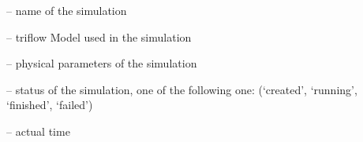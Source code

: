 \documentclass[letterpaper,10pt,english]{sphinxmanual}
\begin{document}
\begin{fulllineitems}

\begin{fulllineitems}
\label{\detokenize{triflow.core:triflow.core.simulation.Simulation.id}}
 -- name of the simulation

\end{fulllineitems}


\begin{fulllineitems}
\label{\detokenize{triflow.core:triflow.core.simulation.Simulation.model}}
 -- triflow Model used in the simulation

\end{fulllineitems}


\begin{fulllineitems}
\label{\detokenize{triflow.core:triflow.core.simulation.Simulation.physical_parameters}}
 -- physical parameters of the simulation

\end{fulllineitems}


\begin{fulllineitems}
\label{\detokenize{triflow.core:triflow.core.simulation.Simulation.status}}
 -- status of the simulation, one of the following one: (`created', `running', `finished', `failed')

\end{fulllineitems}


\begin{fulllineitems}
\label{\detokenize{triflow.core:triflow.core.simulation.Simulation.t}}
 -- actual time

\end{fulllineitems}



\end{fulllineitems}
\end{document}

